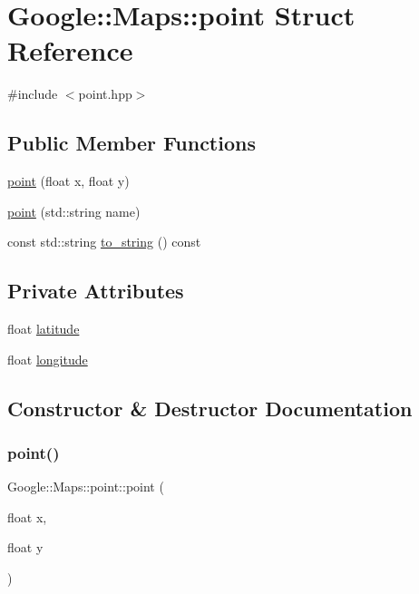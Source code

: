\hypertarget{a00052}{}\section{Google\+:\+:Maps\+:\+:point Struct Reference}
\label{a00052}


{\ttfamily \#include $<$point.\+hpp$>$}

\subsection*{Public Member Functions}
\begin{DoxyCompactItemize}
\item 
\hyperlink{a00052_abcf782dee7c73565e3db32b3d3d8c3f7}{point} (float x, float y)
\item 
\hyperlink{a00052_a57f031ce9ddb5cc80eb5ec3f02ee0641}{point} (std\+::string name)
\item 
const std\+::string \hyperlink{a00052_a9cc5bd886bee44b43dbaf9da0adb2ec3}{to\+\_\+string} () const
\end{DoxyCompactItemize}
\subsection*{Private Attributes}
\begin{DoxyCompactItemize}
\item 
float \hyperlink{a00052_af6b6537d2ea2525753d9e2f170fb2622}{latitude}
\item 
float \hyperlink{a00052_a488d9eb28fe2486d91173646ab620202}{longitude}
\end{DoxyCompactItemize}


\subsection{Constructor \& Destructor Documentation}
\mbox{\label{a00052_abcf782dee7c73565e3db32b3d3d8c3f7}} 
\subsubsection{\texorpdfstring{point()}{point()}\hspace{0.1cm}{\footnotesize\ttfamily [1/2]}}
{\footnotesize\ttfamily Google\+::\+Maps\+::point\+::point (\begin{DoxyParamCaption}\item[{float}]{x,  }\item[{float}]{y }\end{DoxyParamCaption})\hspace{0.3cm}{\ttfamily [inline]}}

